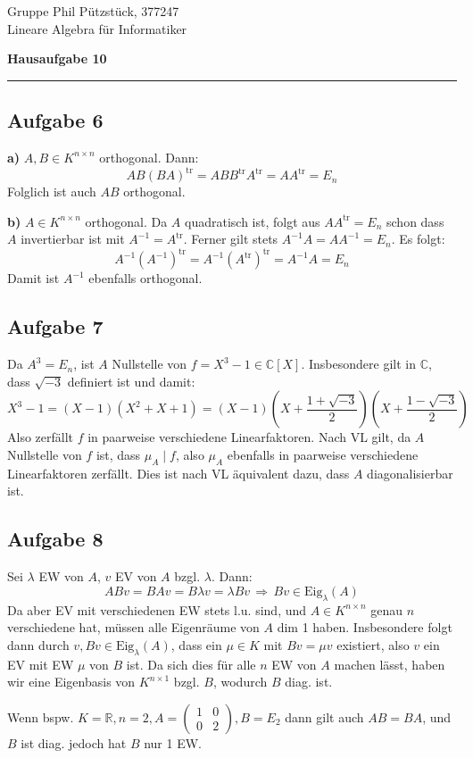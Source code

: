 \documentclass[a4paper,graphics,11pt]{article}
\newcommand{\aufgabe}[1]{\subsection*{Aufgabe #1}}
\begin{document}
\noindent Gruppe              \hfill Phil Pützstück, 377247\\
\noindent Lineare Algebra für Informatiker\\
\begin{center}
	\LARGE{\textbf{Hausaufgabe 10}}
\end{center}
\begin{center}
\rule[0.1ex]{\textwidth}{1pt}
\end{center}



\aufgabe{6}
\textbf{a)}
$A,B \in K^{n \times n}$ orthogonal. Dann:
$$
    AB(BA)^{\text{tr}} = ABB^{\text{tr}}A^\text{tr} = AA^\text{tr} = E_n
$$
Folglich ist auch $AB$ orthogonal.

\textbf{b)}
$A \in K^{n \times n}$ orthogonal. Da $A$ quadratisch ist, folgt aus
$AA^\text{tr} = E_n$ schon dass $A$ invertierbar ist mit $A^{-1} = A^\text{tr}$.
Ferner gilt stets $A^{-1}A = AA^{-1} = E_n$. Es folgt:
$$
    A^{-1}(A^{-1})^\text{tr} = A^{-1}(A^\text{tr})^\text{tr} = A^{-1}A = E_n
$$
Damit ist $A^{-1}$ ebenfalls orthogonal.

\aufgabe{7}
Da $A^3 = E_n$, ist $A$ Nullstelle von $f = X^3 - 1 \in \mathbb{C}[X]$.
Insbesondere gilt in $\mathbb{C}$, dass $\sqrt{-3}$ definiert ist und damit:
$$
    X^3-1 = (X-1)(X^2+X+1) = (X-1)(X+\frac{1+\sqrt{-3}}{2})(X+\frac{1-\sqrt{-3}}{2})
$$
Also zerfällt $f$ in paarweise verschiedene Linearfaktoren. Nach VL gilt,
da $A$ Nullstelle von $f$ ist, dass $\mu_A \mid f$, also $\mu_A$ ebenfalls
in paarweise verschiedene Linearfaktoren zerfällt.
Dies ist nach VL äquivalent dazu, dass $A$ diagonalisierbar ist.

\aufgabe{8}
Sei $\lambda$ EW von $A$, $v$ EV von $A$ bzgl. $\lambda$. Dann:
$$
    ABv = BAv = B\lambda v = \lambda Bv \,\Longrightarrow\, Bv \in \text{Eig}_\lambda(A)
$$
Da aber EV mit verschiedenen EW stets l.u. sind, und $A \in K^{n\times n}$ genau $n$
verschiedene hat, müssen alle Eigenräume von $A$ dim 1 haben. Insbesondere
folgt dann durch $v, Bv \in \text{Eig}_\lambda(A)$, dass ein $\mu \in K$ mit
$Bv = \mu v$ existiert, also $v$ ein EV mit EW $\mu$ von $B$ ist.
Da sich dies für alle $n$ EW von $A$ machen lässt, haben wir eine Eigenbasis
von $K^{n \times 1}$ bzgl. $B$, wodurch $B$ diag. ist.

Wenn bspw. $K = \mathbb{R}, n = 2, A = \begin{pmatrix}1 & 0 \\ 0 & 2\end{pmatrix},B = E_2$
 dann gilt auch $AB = BA$, und $B$ ist diag. jedoch hat $B$ nur 1 EW.
\end{document}
